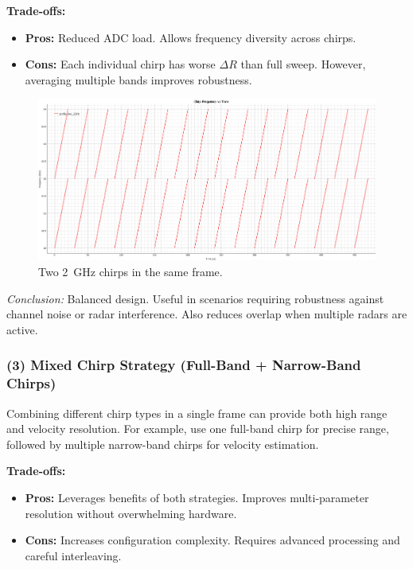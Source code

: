 \textbf{Trade-offs:}
\begin{itemize}
    \item \textbf{Pros:} Reduced ADC load. Allows frequency diversity across chirps.
    \item \textbf{Cons:} Each individual chirp has worse $\Delta R$ than full sweep. However, averaging multiple bands improves robustness.
\end{itemize}

\begin{figure}[!htbp]
    \centering
    \includegraphics[width=1.0\linewidth]{images/profile_two_2GHz.png}
    \caption{Two 2~GHz chirps in the same frame.}
    \label{fig:profile2GHz}
\end{figure}

{\small
\textit{Conclusion:} Balanced design.
Useful in scenarios requiring robustness against channel noise or radar interference.
Also reduces overlap when multiple radars are active.
}

\vspace{1em}

\subsubsection*{(3) Mixed Chirp Strategy (Full-Band + Narrow-Band Chirps)}

Combining different chirp types in a single frame can provide both high range and velocity resolution.
For example, use one full-band chirp for precise range, followed by multiple narrow-band chirps for velocity estimation.

\textbf{Trade-offs:}
\begin{itemize}
    \item \textbf{Pros:} Leverages benefits of both strategies. Improves multi-parameter resolution without overwhelming hardware.
    \item \textbf{Cons:} Increases configuration complexity. Requires advanced processing and careful interleaving.
\end{itemize}

